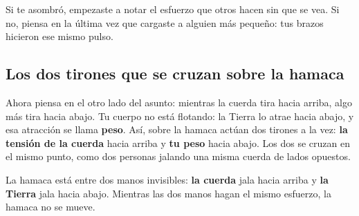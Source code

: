 \documentclass[
  spanish,
  letterpaper,
  12pt,
  oneside,
  open=any,
  DIV=15]{scrbook}
\begin{document}
\begin{tcolorbox}[enhanced jigsaw, arc=.35mm, bottomrule=.15mm, bottomtitle=1mm, breakable, colback=white, colbacktitle=quarto-callout-tip-color!10!white, colframe=quarto-callout-tip-color-frame, coltitle=black, left=2mm, leftrule=.75mm, opacityback=0, opacitybacktitle=0.6, rightrule=.15mm, title=\textcolor{quarto-callout-tip-color}{\faLightbulb}\hspace{0.5em}{Sobre la pregunta socioemocional}, titlerule=0mm, toprule=.15mm, toptitle=1mm]

Si te asombró, empezaste a notar el esfuerzo que otros hacen sin que se
vea. Si no, piensa en la última vez que cargaste a alguien más pequeño:
tus brazos hicieron ese mismo pulso.

\end{tcolorbox}

\subsection{Los dos tirones que se cruzan sobre la
hamaca}\label{los-dos-tirones-que-se-cruzan-sobre-la-hamaca}

Ahora piensa en el otro lado del asunto: mientras la cuerda tira hacia
arriba, algo más tira hacia abajo. Tu cuerpo no está flotando: la Tierra
lo atrae hacia abajo, y esa atracción se llama \textbf{peso}. Así, sobre
la hamaca actúan dos tirones a la vez:
\textcolor[HTML]{7C3AED}{\textbf{la tensión de la cuerda}} hacia arriba
y \textcolor[HTML]{2563EB}{\textbf{tu peso}} hacia abajo. Los dos se
cruzan en el mismo punto, como dos personas jalando una misma cuerda de
lados opuestos.

\begin{tcolorbox}[enhanced jigsaw, arc=.35mm, bottomrule=.15mm, bottomtitle=1mm, breakable, colback=white, colbacktitle=quarto-callout-note-color!10!white, colframe=quarto-callout-note-color-frame, coltitle=black, left=2mm, leftrule=.75mm, opacityback=0, opacitybacktitle=0.6, rightrule=.15mm, title=\textcolor{quarto-callout-note-color}{\faInfo}\hspace{0.5em}{Apoyo Visual}, titlerule=0mm, toprule=.15mm, toptitle=1mm]

La hamaca está entre dos manos invisibles:
\textcolor[HTML]{7C3AED}{\textbf{la cuerda}} jala hacia arriba y
\textcolor[HTML]{2563EB}{\textbf{la Tierra}} jala hacia abajo. Mientras
las dos manos hagan el mismo esfuerzo, la hamaca no se mueve.

\end{tcolorbox}
\end{document}
